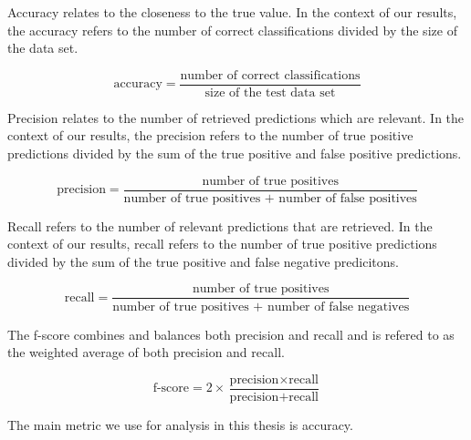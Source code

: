 Accuracy relates to the closeness to the true value. In the context of our results, the accuracy refers to the number of correct classifications 
divided by the size of the data set.

\[
 \text{accuracy} = \frac{\text{number of correct classifications}}{\text{size of the test data set}}
\]

Precision relates to the number of retrieved predictions which are relevant. In the context of our results, the precision refers to the number of true positive predictions 
divided by the sum of the true positive and false positive predictions.

\[
 \text{precision} = \frac{\text{number of true positives}}{\text{number of true positives + number of false positives}}
\]

Recall refers to the number of relevant predictions that are retrieved. In the context of our results, recall refers to the number of true positive predictions 
divided by the sum of the true positive and false negative predicitons.

\[
 \text{recall} = \frac{\text{number of true positives}}{\text{number of true positives + number of false negatives}}
\]

The f-score combines and balances both precision and recall and is refered to as the weighted average of both precision and recall. 

\[
 \text{f-score} = 2 \times \frac{\text{precision} \times \text{recall}}{\text{precision} + \text{recall}}
\]

The main metric we use for analysis in this thesis is accuracy.

